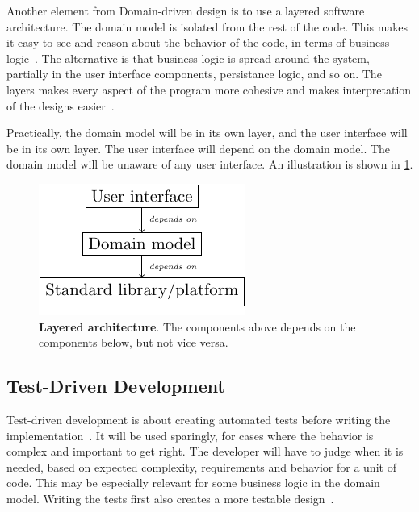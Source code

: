 Another element from Domain-driven design is to use a layered software architecture.
The domain model is isolated from the rest of the code.
This makes it easy to see and reason about the behavior of the code, in terms of business logic~\cite[p.~69]{evansDomaindrivenDesignTackling2004}.
The alternative is that business logic is spread around the system, partially in the user interface components, persistance logic, and so on.
The layers makes every aspect of the program more cohesive and makes interpretation of the designs easier~\cite[p.~69]{evansDomaindrivenDesignTackling2004}.


Practically, the domain model will be in its own layer, and the user interface will be in its own layer.
The user interface will depend on the domain model.
The domain model will be unaware of any user interface.
An illustration is shown in \cref{fig:ddd-layered}.

\begin{figure}[htbp]  %
  \centering
  \includegraphics{figures/layered.pdf}
  \caption[Layered Architecture]{\textbf{Layered architecture}. The components above depends on the components below, but not vice versa.}\label{fig:ddd-layered}
\end{figure}


\subsection{Test-Driven Development}

Test-driven development is about creating automated tests before writing the implementation~\cite[p.~105]{knibergScrumXPTrenches2015}.
It will be used sparingly, for cases where the behavior is complex and important to get right.
The developer will have to judge when it is needed, based on expected complexity, requirements and behavior for a unit of code.
This may be especially relevant for some business logic in the domain model.
Writing the tests first also creates a more testable design~\cite[p.~106]{knibergScrumXPTrenches2015}.


